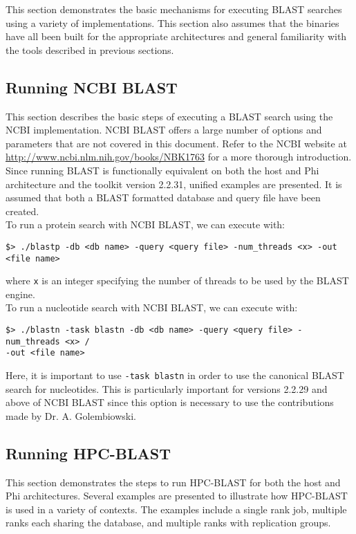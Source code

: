 \documentclass[10pt]{article}
\begin{document}
This section demonstrates the basic mechanisms for executing BLAST searches using a variety of implementations.  This section also assumes that the binaries have all been built for the appropriate architectures and general familiarity with the tools described
in previous sections.

\subsection{Running NCBI BLAST} \label{ssec:runncbi}

This section describes the basic steps of executing a BLAST search using the NCBI implementation.  NCBI BLAST offers a large number of options and parameters that are not covered in this document. Refer to the NCBI website
at \url{http://www.ncbi.nlm.nih.gov/books/NBK1763} for a more thorough introduction.  Since running BLAST is functionally equivalent on both the host and Phi architecture and the toolkit version 2.2.31, unified examples are presented.
It is assumed that both a BLAST formatted database and query file have been created.\\

\noindent To run a protein search with NCBI BLAST, we can execute with:
\begin{verbatim}
$> ./blastp -db <db name> -query <query file> -num_threads <x> -out <file name>
\end{verbatim}
\noindent where \verb^x^ is an integer specifying the number of threads to be used by the BLAST engine.\\

\noindent To run a nucleotide search with NCBI BLAST, we can execute with:
\begin{verbatim}
$> ./blastn -task blastn -db <db name> -query <query file> -num_threads <x> /
-out <file name>
\end{verbatim}
\noindent Here, it is important to use \verb^-task blastn^ in order to use the canonical BLAST search for nucleotides.  This is particularly important for versions 2.2.29 and above of NCBI BLAST since this option is necessary to use the contributions made
by Dr. A. Golembiowski.

\subsection{Running HPC-BLAST} \label{ssec:runhpc}

This section demonstrates the steps to run HPC-BLAST for both the host and Phi architectures.  Several examples are presented to illustrate how HPC-BLAST is used in a variety of contexts. The examples include a single rank job, multiple ranks
each sharing the database, and multiple ranks with replication groups.
\end{document}
